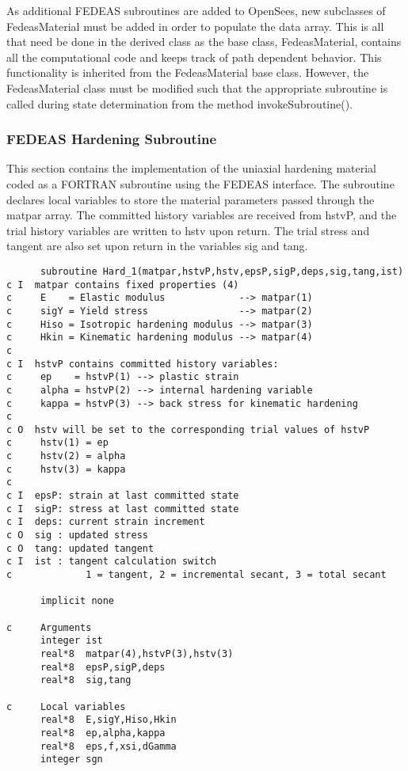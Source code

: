 \documentclass[12pt]{article}
\begin{document}
{As additional FEDEAS subroutines are added to OpenSees, new subclasses of FedeasMaterial
must be added in order to populate the data array. This is all that need
be done in the derived class as the base class, FedeasMaterial, contains all the 
computational code and keeps track of path dependent behavior. This functionality is
inherited from the FedeasMaterial base class. However, the FedeasMaterial class 
must be modified such that the appropriate
subroutine is called during state determination from the method invokeSubroutine().

\subsubsection{FEDEAS Hardening Subroutine}
This section contains the implementation of the uniaxial hardening material coded as a
FORTRAN subroutine using the FEDEAS interface. The subroutine declares local variables
to store the material parameters passed through the matpar array. The committed history
variables are received from hstvP, and the trial history variables are written to hstv
upon return. The trial stress and tangent are also set upon return in the variables
sig and tang.

{\sf\small
\begin{verbatim}
      subroutine Hard_1(matpar,hstvP,hstv,epsP,sigP,deps,sig,tang,ist)
c I  matpar contains fixed properties (4)
c     E    = Elastic modulus             --> matpar(1)
c     sigY = Yield stress                --> matpar(2)
c     Hiso = Isotropic hardening modulus --> matpar(3)
c     Hkin = Kinematic hardening modulus --> matpar(4)
c
c I  hstvP contains committed history variables:
c     ep    = hstvP(1) --> plastic strain
c     alpha = hstvP(2) --> internal hardening variable
c     kappa = hstvP(3) --> back stress for kinematic hardening
c	 
c O  hstv will be set to the corresponding trial values of hstvP
c     hstv(1) = ep    
c     hstv(2) = alpha 
c     hstv(3) = kappa 
c
c I  epsP: strain at last committed state
c I  sigP: stress at last committed state
c I  deps: current strain increment
c O  sig : updated stress
c O  tang: updated tangent
c I  ist : tangent calculation switch 
c             1 = tangent, 2 = incremental secant, 3 = total secant

      implicit none
 
c     Arguments
      integer ist
      real*8  matpar(4),hstvP(3),hstv(3)
      real*8  epsP,sigP,deps
      real*8  sig,tang

c     Local variables
      real*8  E,sigY,Hiso,Hkin
      real*8  ep,alpha,kappa   
      real*8  eps,f,xsi,dGamma
      integer sgn


\end{verbatim}}}
\end{document}

